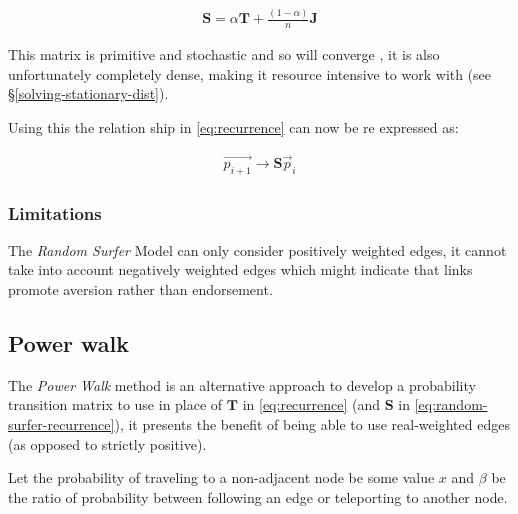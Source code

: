 \documentclass[11pt, twoside]{report}
\begin{document}
\begin{align}
\mathbf{S} = \alpha \mathbf{T} + \frac{(1- \alpha)}{n} \mathbf{J} \label{eq:random-surfer}
\end{align}

This matrix is primitive and stochastic and so will converge
\cite[]{langvilleGooglePageRankScience2012}, it is also
unfortunately completely dense, making it resource intensive to work with (see
\S \ref{solving-stationary-dist}).

Using this the relation ship in \eqref{eq:recurrence} can now be re
expressed as:

\begin{align}
\vec{p_{i+1}} \rightarrow \mathbf{S} \vec{p}_{i} \label{eq:random-surfer-recurrence}
\end{align}






\subsubsection{Limitations}
\label{sec:org725b0b3}
The \emph{Random Surfer} Model can only consider positively weighted edges, it cannot
take into account negatively weighted edges which might indicate that
links promote aversion rather than endorsement.



\subsection{Power walk}
\label{pwalk}



The \emph{Power Walk} method is an alternative approach to develop a probability
transition matrix to use in place of \(\mathbf{T}\) in \eqref{eq:recurrence} (and \(\mathbf{S}\) in \eqref{eq:random-surfer-recurrence}), it presents the benefit of being able to use real-weighted edges (as opposed to strictly positive).

Let the probability of traveling to a non-adjacent node be some value \(x\)
and \(\beta\) be the ratio of probability between following an edge or
teleporting to another node.
\end{document}
